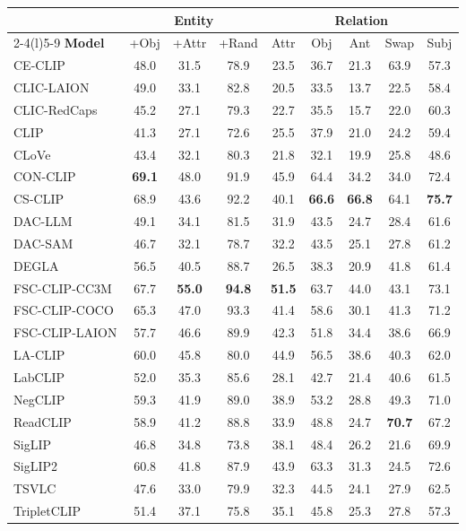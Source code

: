 \begin{tabular}{@{}lccc|ccccc@{}}
\toprule
& \multicolumn{3}{c|}{\textbf{Entity}} & \multicolumn{5}{c}{\textbf{Relation}} \\
\cmidrule(r){2-4}\cmidrule(l){5-9}
\textbf{Model} & +Obj & +Attr & +Rand & Attr & Obj & Ant & Swap & Subj \\
\midrule
CE-CLIP & 48.0 & 31.5 & 78.9 & 23.5 & 36.7 & 21.3 & 63.9 & 57.3 \\
CLIC-LAION & 49.0 & 33.1 & 82.8 & 20.5 & 33.5 & 13.7 & 22.5 & 58.4 \\
CLIC-RedCaps & 45.2 & 27.1 & 79.3 & 22.7 & 35.5 & 15.7 & 22.0 & 60.3 \\
CLIP & 41.3 & 27.1 & 72.6 & 25.5 & 37.9 & 21.0 & 24.2 & 59.4 \\
CLoVe & 43.4 & 32.1 & 80.3 & 21.8 & 32.1 & 19.9 & 25.8 & 48.6 \\
CON-CLIP & \textbf{69.1} & 48.0 & 91.9 & 45.9 & 64.4 & 34.2 & 34.0 & 72.4 \\
CS-CLIP & 68.9 & 43.6 & 92.2 & 40.1 & \textbf{66.6} & \textbf{66.8} & 64.1 & \textbf{75.7} \\
DAC-LLM & 49.1 & 34.1 & 81.5 & 31.9 & 43.5 & 24.7 & 28.4 & 61.6 \\
DAC-SAM & 46.7 & 32.1 & 78.7 & 32.2 & 43.5 & 25.1 & 27.8 & 61.2 \\
DEGLA & 56.5 & 40.5 & 88.7 & 26.5 & 38.3 & 20.9 & 41.8 & 61.4 \\
FSC-CLIP-CC3M & 67.7 & \textbf{55.0} & \textbf{94.8} & \textbf{51.5} & 63.7 & 44.0 & 43.1 & 73.1 \\
FSC-CLIP-COCO & 65.3 & 47.0 & 93.3 & 41.4 & 58.6 & 30.1 & 41.3 & 71.2 \\
FSC-CLIP-LAION & 57.7 & 46.6 & 89.9 & 42.3 & 51.8 & 34.4 & 38.6 & 66.9 \\
LA-CLIP & 60.0 & 45.8 & 80.0 & 44.9 & 56.5 & 38.6 & 40.3 & 62.0 \\
LabCLIP & 52.0 & 35.3 & 85.6 & 28.1 & 42.7 & 21.4 & 40.6 & 61.5 \\
NegCLIP & 59.3 & 41.9 & 89.0 & 38.9 & 53.2 & 28.8 & 49.3 & 71.0 \\
ReadCLIP & 58.9 & 41.2 & 88.8 & 33.9 & 48.8 & 24.7 & \textbf{70.7} & 67.2 \\
SigLIP & 46.8 & 34.8 & 73.8 & 38.1 & 48.4 & 26.2 & 21.6 & 69.9 \\
SigLIP2 & 60.8 & 41.8 & 87.9 & 43.9 & 63.3 & 31.3 & 24.5 & 72.6 \\
TSVLC & 47.6 & 33.0 & 79.9 & 32.3 & 44.5 & 24.1 & 27.9 & 62.5 \\
TripletCLIP & 51.4 & 37.1 & 75.8 & 35.1 & 45.8 & 25.3 & 27.8 & 57.3 \\
\bottomrule
\end{tabular}